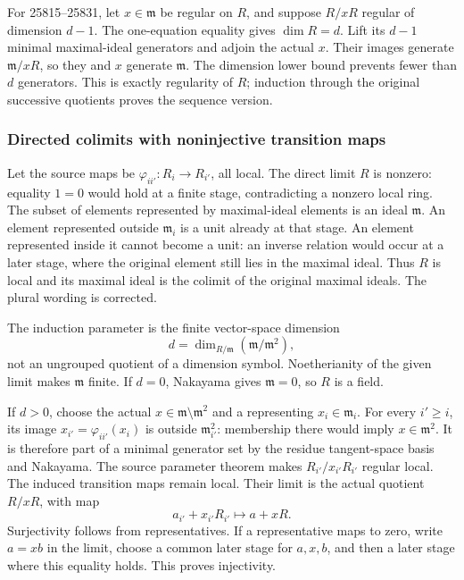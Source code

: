 For 25815--25831, let \(x\in\mathfrak m\) be regular on \(R\), and suppose \(R/xR\) regular of dimension \(d-1\). The one-equation equality gives \(\dim R=d\). Lift its \(d-1\) minimal maximal-ideal generators and adjoin the actual \(x\). Their images generate \(\mathfrak m/xR\), so they and \(x\) generate \(\mathfrak m\). The dimension lower bound prevents fewer than \(d\) generators. This is exactly regularity of \(R\); induction through the original successive quotients proves the sequence version.

\subsubsection{Directed colimits with noninjective transition maps}\label{directed-colimits-with-noninjective-transition-maps}

Let the source maps be \(\varphi_{ii'}:R_i\to R_{i'}\), all local. The direct limit \(R\) is nonzero: equality \(1=0\) would hold at a finite stage, contradicting a nonzero local ring. The subset of elements represented by maximal-ideal elements is an ideal \(\mathfrak m\). An element represented outside \(\mathfrak m_i\) is a unit already at that stage. An element represented inside it cannot become a unit: an inverse relation would occur at a later stage, where the original element still lies in the maximal ideal. Thus \(R\) is local and its maximal ideal is the colimit of the original maximal ideals. The plural wording is corrected.

The induction parameter is the finite vector-space dimension \[
 d=\dim_{R/\mathfrak m}(\mathfrak m/\mathfrak m^2),
\] not an ungrouped quotient of a dimension symbol. Noetherianity of the given limit makes \(\mathfrak m\) finite. If \(d=0\), Nakayama gives \(\mathfrak m=0\), so \(R\) is a field.

If \(d>0\), choose the actual \(x\in\mathfrak m\setminus\mathfrak m^2\) and a representing \(x_i\in\mathfrak m_i\). For every \(i'\ge i\), its image \(x_{i'}=\varphi_{ii'}(x_i)\) is outside \(\mathfrak m_{i'}^2\): membership there would imply \(x\in\mathfrak m^2\). It is therefore part of a minimal generator set by the residue tangent-space basis and Nakayama. The source parameter theorem makes \(R_{i'}/x_{i'}R_{i'}\) regular local. The induced transition maps remain local. Their limit is the actual quotient \(R/xR\), with map \[
 a_{i'}+x_{i'}R_{i'}\longmapsto a+xR.
\] Surjectivity follows from representatives. If a representative maps to zero, write \(a=xb\) in the limit, choose a common later stage for \(a,x,b\), and then a later stage where this equality holds. This proves injectivity.

